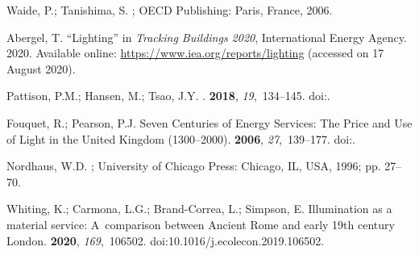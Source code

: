 \documentclass[energies,article,accept,moreauthors,pdftex]{Definitions/mdpi}\usepackage[]{graphicx}\usepackage[]{color}
\begin{document}



\begin{thebibliography}{999}
\providecommand{\natexlab}[1]{#1}

Waide, P.; Tanishima, S.
;
  OECD Publishing: Paris, France,  2006.%

Abergel, T.
\newblock ``{L}ighting'' in \emph{Tracking Buildings 2020}, {International
  Energy Agency}. 2020. Available online:
\newblock \url{https://www.iea.org/reports/lighting} (accessed on 17 August 2020).%

Pattison, P.M.; Hansen, M.; Tsao, J.Y.
.
 {\bf 2018}, {\em 19},~134--145.
\newblock
  doi:{\href{https://doi.org/10.1016/j.crhy.2017.10.013}{}}.%

Fouquet, R.; Pearson, P.J.
\newblock Seven Centuries of Energy Services: The Price and Use of Light in the
  {U}nited {K}ingdom (1300--2000).
 {\bf 2006}, {\em 27},~139--177.%
\newblock
  doi:{\href{https://doi.org/10.5547/issn0195-6574-ej-vol27-no1-8}{}}.

Nordhaus, W.D.
; University of Chicago Press: Chicago, IL, USA, 1996; pp. 27--70.%

Whiting, K.; Carmona, L.G.; Brand-Correa, L.; Simpson, E.
\newblock Illumination as a material service: A~comparison between Ancient Rome
  and early 19th century London.
 {\bf 2020}, {\em 169},~106502.
\newblock doi:10.1016/j.ecolecon.2019.106502.%


\end{thebibliography}
\end{document}
